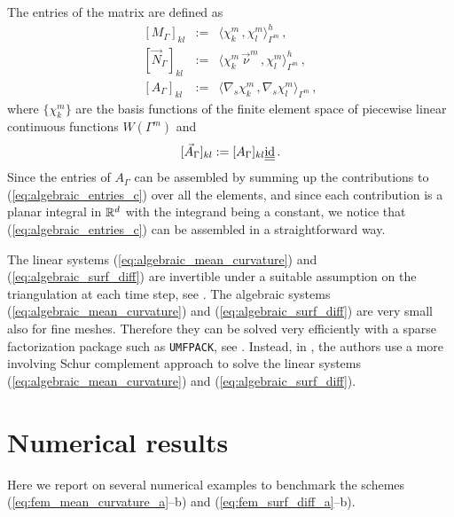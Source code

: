 The entries of the matrix are defined as
\begin{eqnarray}
\left[ M_\Gamma \right]_{kl} & := & \langle \chi_k^m \, , \chi_l^m
\rangle_{\Gamma^m}^h\,,\label{eq:algebraic_entries_a} \\
\left[ \vec N_\Gamma \right]_{kl} & := & \langle \chi_k^m \, \vec \nu^m\,,
\chi_l^m \rangle_{\Gamma^m}^h\,,\label{eq:algebraic_entries_b} \\
\left[ A_\Gamma \right]_{kl} & := & \langle \nabla_s \chi_k^m \, , \nabla_s
\chi_l^m \rangle_{\Gamma^m}\,,\label{eq:algebraic_entries_c}
\end{eqnarray}
where $\{\chi_k^m\}$ are the basis functions of the finite element space of
piecewise linear continuous functions $W(\Gamma^m)$ and
\begin{equation}\label{eq:algebraic_entries_d}
[\vec A_\Gamma]_{kl} := [A_\Gamma]_{kl} \mat \id\,.
\end{equation}
Since the entries of $A_\Gamma$ can be assembled by summing up the contributions
to (\ref{eq:algebraic_entries_c}) over all the elements, and since each
contribution is a planar integral in $\mathbb R^d$ with the integrand being a
constant, we notice that (\ref{eq:algebraic_entries_c}) can be assembled in a
straightforward way.

The linear systems (\ref{eq:algebraic_mean_curvature}) and
(\ref{eq:algebraic_surf_diff}) are invertible under a suitable assumption on the
triangulation at each time step, see \cite{gflows3d}. The algebraic systems
(\ref{eq:algebraic_mean_curvature}) and (\ref{eq:algebraic_surf_diff}) are
very small also for fine meshes. Therefore they can be solved very efficiently
with a sparse factorization package such as \verb|UMFPACK|, see \cite{Davis04}.
Instead, in \cite{gflows3d}, the authors use a more involving Schur complement
approach to solve the linear systems (\ref{eq:algebraic_mean_curvature}) and
(\ref{eq:algebraic_surf_diff}).

\section{Numerical results}\label{sec:geometric_pdes_results}
Here we report on several numerical examples to benchmark the schemes
(\ref{eq:fem_mean_curvature_a}--b) and (\ref{eq:fem_surf_diff_a}--b).

